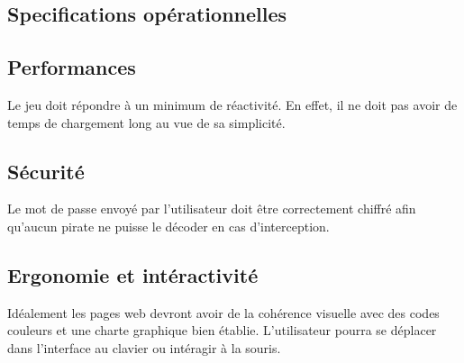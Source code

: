 \subsection{Specifications opérationnelles}

    \subsection{Performances}

        Le jeu doit répondre à un minimum de réactivité. En effet, il ne doit pas avoir de temps de chargement long au vue de sa simplicité.

    \subsection{Sécurité}

        Le mot de passe envoyé par l'utilisateur doit être correctement chiffré afin qu'aucun pirate ne puisse le décoder en cas d'interception.

    \subsection{Ergonomie et intéractivité}

        Idéalement les pages web devront avoir de la cohérence visuelle avec des codes couleurs et une charte graphique bien établie. L'utilisateur  pourra se déplacer dans l'interface au clavier ou intéragir à la souris.
